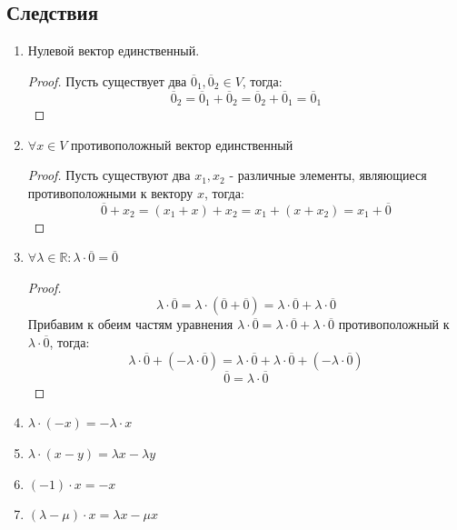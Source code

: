 \documentclass[a4paper, 12pt]{article}
\newcommand{\R}{\mathbb R}
\theoremstyle{definition}
\begin{document}
  \subsection{Следствия}
  \begin{enumerate}
    \item Нулевой вектор единственный.
    \begin{proof}
      Пусть существует два $\overline{0}_1,\overline{0}_2 \in V$, тогда: $$\overline{0}_2 = \overline{0}_1 + \overline{0}_2 = \overline{0}_2 + \overline{0}_1 = \overline{0}_1$$   
    \end{proof} 
    \item $\forall x \in V$ противоположный вектор единственный
    \begin{proof}
      Пусть существуют два $x_1,x_2$ - различные элементы,  являющиеся противоположными к вектору $x$, тогда:
      $$\overline{0} + x_2 = (x_1 + x) + x_2 = x_1 + (x + x_2) = x_1 + \overline{0}$$    
    \end{proof} 
    \item $\forall \lambda \in \R: \lambda \cdot \overline{0} = \overline{0}$ 
      \begin{proof}
      $$\lambda \cdot \overline{0} = \lambda \cdot (\overline{0}+\overline{0}) = \lambda \cdot \overline{0} + \lambda \cdot \overline{0}$$ Прибавим к обеим частям уравнения $\lambda \cdot \overline{0} = \lambda \cdot \overline{0} + \lambda \cdot \overline{0}$  противоположный к $\lambda \cdot \overline{0}$, тогда: $$\lambda \cdot \overline{0} + (-\lambda \cdot \overline{0})= \lambda \cdot \overline{0} + \lambda \cdot \overline{0} + (-\lambda \cdot \overline{0})$$ $$\overline{0} = \lambda \cdot \overline{0}$$ 
      \end{proof} 
    \item $\lambda \cdot (-x) = -\lambda \cdot x$
    \item $\lambda \cdot (x-y) = \lambda x - \lambda y$ 
    \item $(-1) \cdot x = -x$
    \item $(\lambda - \mu)\cdot x = \lambda x - \mu x$  
  \end{enumerate}
\end{document}

